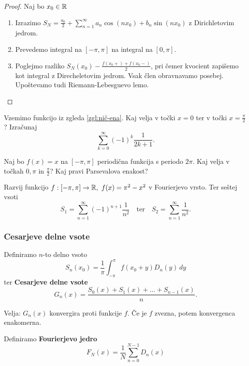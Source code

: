 \begin{proof} Naj bo \(x_0 \in \mathbb{R}\)
    \begin{enumerate}
        \item Izrazimo \(S_N = \frac{a_0}{2} + \sum_{n=1}^{\infty} a_n \cos(nx_0) + b_n \sin(nx_0)\) z Dirichletovim jedrom.
        \item Prevedemo integral na \([-\pi, \pi]\) na integral na \([0, \pi]\).
        \item Poglejmo razliko \(S_N(x_0) - \frac{f(x_0+) + f(x_0-)}{2}\), pri čemer kvocient zapišemo kot integral z Direcheletovim jedrom. Vsak člen obravnavamo posebej. Upoštevamo tudi Riemann-Lebesguevo lemo.
    \end{enumerate}
\end{proof}

\begin{zgled}
    Vzemimo funkcijo iz zgleda \ref{zgl:nič-ena}. Kaj velja v točki \(x =0\) ter v točki \(x = \frac{\pi}{2}\)? Izračunaj \[
        \sum_{k=0}^{\infty}(-1)^{k}\frac{1}{2k+1}.
    \]
\end{zgled}

\begin{zgled}
    Naj bo \(f(x) = x\) na \([-\pi, \pi]\) periodična funkcija s periodo \(2\pi\). Kaj velja v točkah \(0, \pi\) in \(\frac{\pi}{2}\)? Kaj pravi Parsevalova enakost?
\end{zgled}

\begin{zgled}
    Razvij funkcijo \(f: [-\pi, \pi] \to \R, \ f(x) = \pi^2 - x^2\) v Fourierjevo vrsto. Ter seštej vsoti 
    \[
        S_1 = \sum_{n=1}^{\infty} (-1)^{n+1} \frac{1}{n^2} \quad \text{ter} \quad S_2 = \sum_{n=1}^{\infty} \frac{1}{n^2}.
    \]
\end{zgled}

\subsubsection{Cesarjeve delne vsote}
Definiramo \(n\)-to delno vsoto
\[
    S_n(x_0) = \frac{1}{\pi} \int_{-\pi}^{\pi} f(x_0 + y)D_n(y) \, dy
\]
ter \textbf{Cesarjeve delne vsote}
\[
    G_n(x) = \frac{S_0(x) + S_1(x) + \ldots + S_{n-1}(x)}{n}.
\]

Velja: \(G_n(x)\) konvergira proti funkcije \(f\). Če je \(f\) zvezna, potem konvergenca enakomerna. 

Definiramo \textbf{Fourierjevo jedro}
\[
    F_N(x) = \frac{1}{N}\sum_{n=0}^{N-1} D_n(x)
\]

